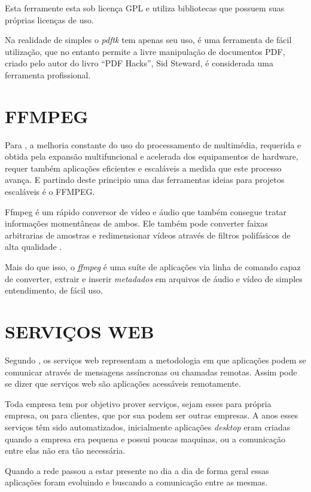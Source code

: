 Esta ferramente esta sob licença GPL e utiliza bibliotecas que possuem suas próprias licenças de uso.

Na realidade de simples o \textit{pdftk} tem apenas seu uso, é uma ferramenta de fácil utilização, que no entanto permite a livre manipulação de documentos PDF, criado pelo autor do livro “PDF Hacks”, Sid Steward, é considerada uma ferramenta profissional.

\section{FFMPEG}

Para \cite{Zhang-Zeng-Xu-Guo-Yan-Wang}, a melhoria constante do uso do processamento de multimédia, requerida e obtida pela expansão multifuncional e acelerada dos equipamentos de hardware, requer também aplicações eficientes e escaláveis a medida que este processo avança. E partindo deste principio uma das ferramentas ideias para projetos escaláveis é o FFMPEG.

Ffmpeg é um rápido conversor de vídeo e áudio que também consegue tratar informações momentâneas de ambos. Ele também pode converter faixas arbitrarias de amostras e redimensionar vídeos através de filtros polifásicos de alta qualidade \cite{FFMPEG}.

Mais do que isso, o \textit{ffmpeg} é uma suíte de aplicações via linha de comando capaz de converter, extrair e inserir \textit{metadados} em arquivos de áudio e vídeo de simples entendimento, de fácil uso.

\section{SERVIÇOS WEB}

Segundo \cite{Pirnau-Apetrei-Badea}, os serviços web representam a metodologia em que aplicações podem se comunicar através de mensagens assíncronas ou chamadas remotas. Assim pode se dizer que serviços web são aplicações acessáveis remotamente.

Toda empresa tem por objetivo prover serviços, sejam esses para própria empresa, ou para clientes, que por sua podem ser outras empresas. A anos esses serviços têm sido automatizados, inicialmente aplicações \textit{desktop} eram criadas quando a empresa era pequena e possui poucas maquinas, ou a comunicação entre elas não era tão necessária.

Quando a rede passou a estar presente no dia a dia de forma geral essas aplicações foram evoluindo e buscando a comunicação entre as mesmas.

